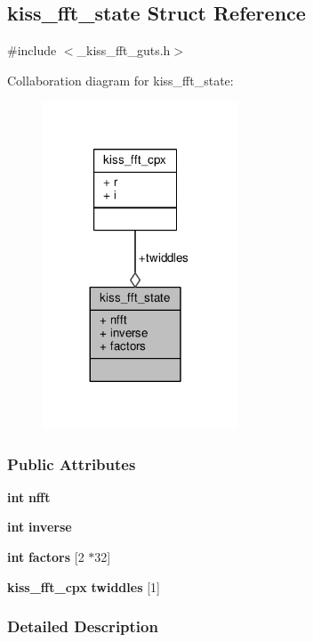 \subsection{kiss\+\_\+fft\+\_\+state Struct Reference}
\label{structkiss__fft__state}


{\ttfamily \#include $<$\+\_\+kiss\+\_\+fft\+\_\+guts.\+h$>$}



Collaboration diagram for kiss\+\_\+fft\+\_\+state\+:
\nopagebreak
\begin{figure}[H]
\begin{center}
\leavevmode
\includegraphics[width=164pt]{d7/d1d/structkiss__fft__state__coll__graph}
\end{center}
\end{figure}
\subsubsection*{Public Attributes}
\begin{DoxyCompactItemize}
\item 
{\bf int} {\bf nfft}
\item 
{\bf int} {\bf inverse}
\item 
{\bf int} {\bf factors} [2 $\ast$32]
\item 
{\bf kiss\+\_\+fft\+\_\+cpx} {\bf twiddles} [1]
\end{DoxyCompactItemize}


\subsubsection{Detailed Description}


